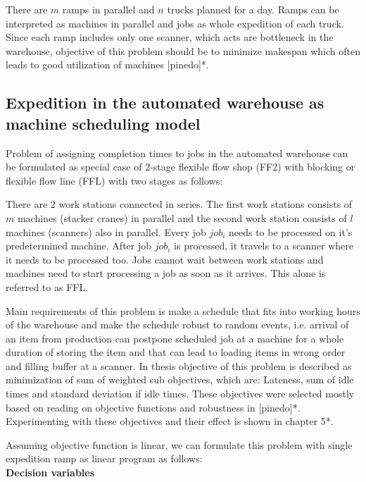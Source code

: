 \documentclass{ctuthesis}
\begin{document}
 There are $m$ ramps in parallel and $n$ trucks planned for a day. Ramps can be interpreted as machines in parallel and jobs as whole expedition of each truck. Since each ramp includes only one scanner, which acts are bottleneck in the warehouse, objective of this problem should be to minimize makespan which often leads to good utilization of machines [pinedo]*.
 
\subsection{Expedition in the automated warehouse as machine scheduling model}

Problem of assigning completion times to jobs in the automated warehouse can be formulated as special case of 2-stage flexible flow shop (FF2) with blocking or flexible flow line (FFL) with two stages as follows:

There are 2 work stations connected in series. The first work stations consists of $m$ machines (stacker cranes) in parallel and the second work station consists of $l$ machines (scanners) also in parallel. Every job $job_i$ needs to be processed on it's predetermined machine. After job $job_i$ is processed, it travels to a scanner where it needs to be processed too. Jobs cannot wait between work stations and machines need to start processing a job as soon as it arrives. This alone is referred to as FFL.

Main requirements of this problem is make a schedule that fits into working hours of the warehouse and make the schedule robust to random events, i.e. arrival of an item from production can postpone scheduled job at a machine for a whole duration of storing the item and that can lead to loading items in wrong order and filling buffer at a scanner. In thesis objective of this problem is described as minimization of sum of weighted sub objectives, which are: Lateness, sum of idle times and standard deviation if idle times. These objectives were selected mostly based on reading on objective functions and robustness in [pinedo]*. Experimenting with these objectives and their effect is shown in chapter 5*.

Assuming objective function is linear, we can formulate this problem with single expedition ramp as linear program as follows:
\\

\textbf{Decision variables}
\end{document}
